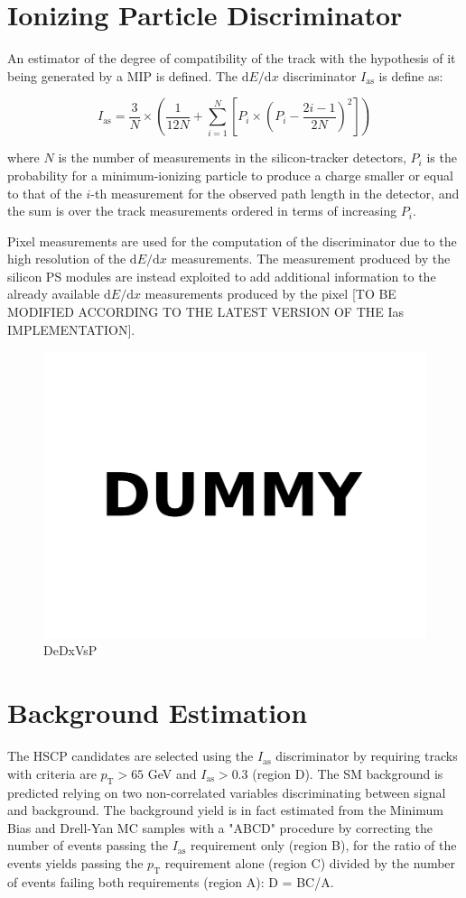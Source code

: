 \documentclass[11pt,twoside,a4paper]{article}
\begin{document}
\section{Ionizing Particle Discriminator}

An estimator of the degree of compatibility of the track with the hypothesis of it being generated by a MIP is defined.
The $\mathrm{d}E/\mathrm{d}x$ discriminator $I_{\mathrm{as}}$ is define as:

$$
I_{\mathrm{as}} = \frac{3}{N} \times \left( \frac{1}{12N} + \sum_{i=1}^{N} \left[ P_i \times \left( P_i - \frac{2i-1}{2N} \right)^2 \right] \right)
$$

where $N$ is the number of measurements in the silicon-tracker detectors, $P_i$ is the probability for a minimum-ionizing particle to produce a charge smaller or equal to that of the $i$-th measurement for the observed path length in the detector, and the sum is over the track measurements ordered in terms of increasing $P_i$.

Pixel measurements are used for the computation of the discriminator due to the high resolution of the $\mathrm{d}E/\mathrm{d}x$ measurements.
The measurement produced by the silicon PS modules are instead exploited to add additional information to the already available $\mathrm{d}E/\mathrm{d}x$ measurements produced by the pixel [TO BE MODIFIED ACCORDING TO THE LATEST VERSION OF THE Ias IMPLEMENTATION].

\begin{figure}
\centering
\includegraphics[width=.5\textwidth]{figures/dummy.pdf}
\caption{DeDxVsP\label{fig:dedxvsp}}
\end{figure}

\section{Background Estimation}

The HSCP candidates are selected using the $I_{\mathrm{as}}$ discriminator by requiring tracks with  criteria are $p_{\mathrm{T}} > 65$ GeV and $I_{\mathrm{as}} > 0.3$ (region D). 
The SM background is predicted relying on two non-correlated variables discriminating between signal and background.
The background yield is in fact estimated from the Minimum Bias and Drell-Yan MC samples with a "ABCD" procedure by correcting the number of events passing the $I_{\mathrm{as}}$ requirement only (region B), for the ratio of the events yields passing the $p_{\mathrm{T}}$ requirement alone (region C) divided by the number of events failing both requirements (region A): D = BC/A.
\end{document}
